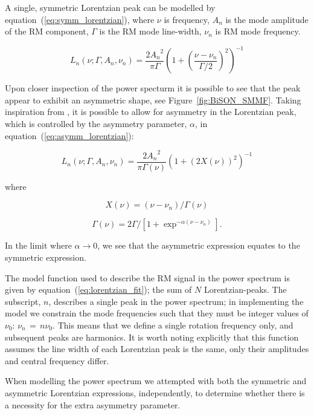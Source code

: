 A single, symmetric Lorentzian peak can be modelled by equation~(\ref{eq:symm_lorentzian}), where $\nu$ is frequency, $A_n$ is the mode amplitude of the RM component, $\Gamma$ is the RM mode line-width, $\nu_n$ is RM mode frequency.

\begin{equation}
L_n(\nu; \Gamma, A_n, \nu_n) = \frac{2{A_n}^2}{\pi \Gamma} \left(1 + \left(\frac{\nu - \nu_{n}}{\Gamma /2}\right)^2\right)^{-1} 
\label{eq:symm_lorentzian}
\end{equation}

Upon closer inspection of the power specturm it is possible to see that the peak appear to exhibit an asymmetric shape, see Figure~\ref{fig:BiSON_SMMF}. Taking inspiration from \citep{howe_solar_2020}, it is possible to allow for asymmetry in the Lorentzian peak, which is controlled by the asymmetry parameter, $\alpha$, in equation~(\ref{eq:asymm_lorentzian}):

\begin{equation}
L_n(\nu; \Gamma, A_n, \nu_n) = \frac{2{A_n}^2}{\pi \Gamma(\nu)} \left(1 + \left(2X(\nu)\right)^2\right)^{-1} 
\label{eq:asymm_lorentzian}
\end{equation}

where

\begin{equation}
X(\nu) = (\nu - \nu_n)/\Gamma(\nu)
\label{eq:asymm_freq}
\end{equation}

\begin{equation}
\Gamma(\nu) = 2\Gamma / [1 + \exp^{-\alpha(\nu - \nu_n)}] .
\label{eq:asymm_width}
\end{equation}

In the limit where $\alpha \rightarrow 0$, we see that the asymmetric expression equates to the symmetric expression.

The model function used to describe the RM signal in the power spectrum is given by equation~(\ref{eq:lorentzian_fit}); the sum of $N$ Lorentzian-peaks. The subscript, $n$, describes a single peak in the power spectrum; in implementing the model we constrain the mode frequencies such that they must be integer values of $\nu_0$: $\nu_n \, = \, n \nu_0$. This means that we define a single rotation frequency only, and subsequent peaks are harmonics. It is worth noting explicitly that this function assumes the line width of each Lorentzian peak is the same, only their amplitudes and central frequency differ.

When modelling the power spectrum we attempted with both the symmetric and asymmetric Lorentzian expressions, independently, to determine whether there is a necessity for the extra asymmetry parameter.

